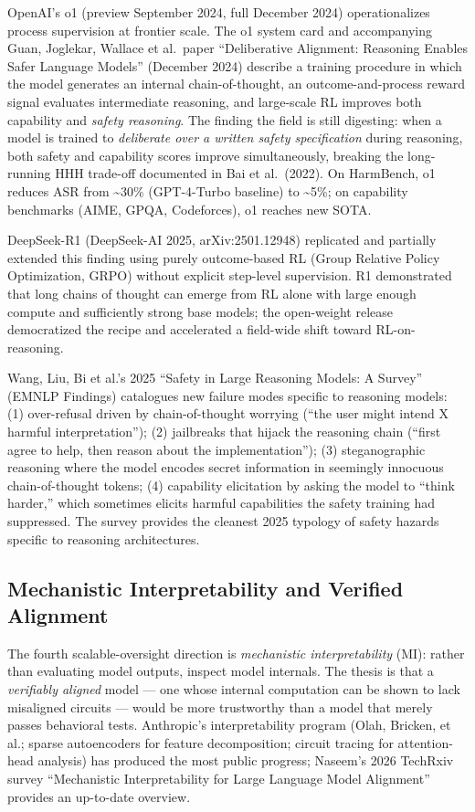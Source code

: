 \documentclass{article}
\begin{document}
OpenAI's o1 (preview September 2024, full December 2024) operationalizes process supervision at frontier scale. The o1 system card and accompanying Guan, Joglekar, Wallace et al.~paper ``Deliberative Alignment: Reasoning Enables Safer Language Models'' (December 2024) describe a training procedure in which the model generates an internal chain-of-thought, an outcome-and-process reward signal evaluates intermediate reasoning, and large-scale RL improves both capability and \emph{safety reasoning}. The finding the field is still digesting: when a model is trained to \emph{deliberate over a written safety specification} during reasoning, both safety and capability scores improve simultaneously, breaking the long-running HHH trade-off documented in Bai et al.~(2022). On HarmBench, o1 reduces ASR from \textasciitilde30\% (GPT-4-Turbo baseline) to \textasciitilde5\%; on capability benchmarks (AIME, GPQA, Codeforces), o1 reaches new SOTA.

DeepSeek-R1 (DeepSeek-AI 2025, arXiv:2501.12948) replicated and partially extended this finding using purely outcome-based RL (Group Relative Policy Optimization, GRPO) without explicit step-level supervision. R1 demonstrated that long chains of thought can emerge from RL alone with large enough compute and sufficiently strong base models; the open-weight release democratized the recipe and accelerated a field-wide shift toward RL-on-reasoning.

Wang, Liu, Bi et al.'s 2025 ``Safety in Large Reasoning Models: A Survey'' (EMNLP Findings) catalogues new failure modes specific to reasoning models: (1) over-refusal driven by chain-of-thought worrying (``the user might intend X harmful interpretation''); (2) jailbreaks that hijack the reasoning chain (``first agree to help, then reason about the implementation''); (3) steganographic reasoning where the model encodes secret information in seemingly innocuous chain-of-thought tokens; (4) capability elicitation by asking the model to ``think harder,'' which sometimes elicits harmful capabilities the safety training had suppressed. The survey provides the cleanest 2025 typology of safety hazards specific to reasoning architectures.

\subsection{Mechanistic Interpretability and Verified Alignment}\label{mechanistic-interpretability-and-verified-alignment}

The fourth scalable-oversight direction is \emph{mechanistic interpretability} (MI): rather than evaluating model outputs, inspect model internals. The thesis is that a \emph{verifiably aligned} model --- one whose internal computation can be shown to lack misaligned circuits --- would be more trustworthy than a model that merely passes behavioral tests. Anthropic's interpretability program (Olah, Bricken, et al.; sparse autoencoders for feature decomposition; circuit tracing for attention-head analysis) has produced the most public progress; Naseem's 2026 TechRxiv survey ``Mechanistic Interpretability for Large Language Model Alignment'' provides an up-to-date overview.
\end{document}
